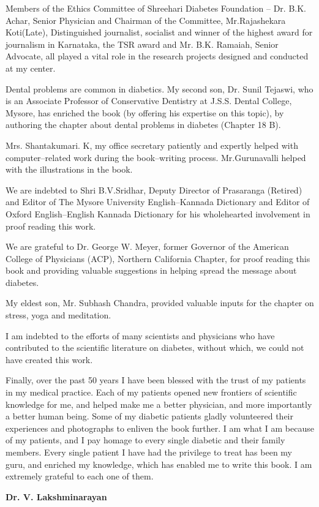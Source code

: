 Members of the Ethics Committee of Shreehari Diabetes Foundation – Dr. B.K. Achar, Senior Physician and Chairman of the Committee, Mr.Rajashekara Koti(Late), Distinguished journalist, socialist and winner of the highest award for journalism in Karnataka, the TSR award and Mr. B.K. Ramaiah, Senior Advocate, all played a vital role in the research projects designed and conducted at my center.

Dental problems are common in diabetics. My second son, Dr. Sunil Tejaswi, who is an Associate Professor of Conservative Dentistry at J.S.S. Dental College, Mysore, has enriched the book (by offering his expertise on this topic), by authoring the chapter about dental problems in diabetes (Chapter 18 B).

Mrs. Shantakumari. K, my office secretary patiently and expertly helped with computer–related work during the book–writing process. Mr.Gurunavalli helped with the illustrations in the book.

We are indebted to Shri B.V.Sridhar, Deputy Director of Prasaranga (Retired) and Editor of The Mysore University English–Kannada Dictionary and Editor of Oxford English–English Kannada Dictionary for his wholehearted involvement in proof reading this work.

We are grateful to Dr. George W. Meyer, former Governor of the American College of Physicians (ACP), Northern California Chapter, for proof reading this book and providing valuable suggestions in helping spread the message about diabetes.

My eldest son, Mr. Subhash Chandra, provided valuable inputs for the chapter on stress, yoga and meditation.

I am indebted to the efforts of many scientists and physicians who have contributed to the scientific literature on diabetes, without which, we could not have created this work.

Finally, over the past 50 years I have been blessed with the trust of my patients in my medical practice. Each of my patients opened new frontiers of scientific knowledge for me, and helped make me a better physician, and more importantly a better human being. Some of my diabetic patients gladly volunteered their experiences and photographs to enliven the book further. I am what I am because of my patients, and I pay homage to every single diabetic and their family members. Every single patient I have had the privilege to treat has been my guru, and enriched my knowledge, which has enabled me to write this book. I am extremely grateful to each one of them.

\begin{flushright}
\textbf{Dr. V. Lakshminarayan}
\end{flushright}

